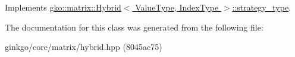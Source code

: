 Implements \hyperlink{classgko_1_1matrix_1_1Hybrid_1_1strategy__type_a0a0cd4024f27c7d0f286f35fc0a6de60}{gko\+::matrix\+::\+Hybrid$<$ Value\+Type, Index\+Type $>$\+::strategy\+\_\+type}.



The documentation for this class was generated from the following file\+:\begin{DoxyCompactItemize}
\item 
ginkgo/core/matrix/hybrid.\+hpp (8045ac75)\end{DoxyCompactItemize}
